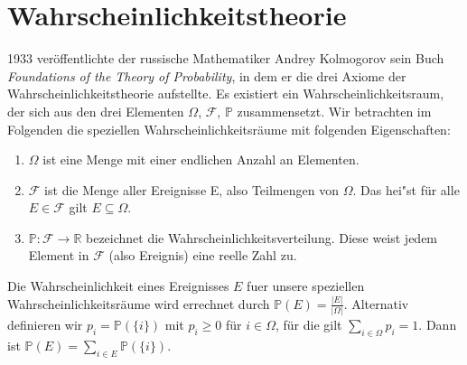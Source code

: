 \section{Wahrscheinlichkeitstheorie}
1933 ver\"offentlichte der russische Mathematiker Andrey Kolmogorov sein Buch \textit{Foundations of the Theory of Probability}, in dem er die drei Axiome der Wahrscheinlichkeitstheorie aufstellte. Es existiert ein Wahrscheinlichkeitsraum, der sich aus den drei Elementen $\Omega$, $\mathcal{F}$, $\mathbb{P}$ zusammensetzt. Wir betrachten im Folgenden die speziellen Wahrscheinlichkeitsr\"aume mit folgenden Eigenschaften:

\begin{enumerate}
	\item $\Omega$ ist eine Menge mit einer endlichen Anzahl an Elementen.
	\item $\mathcal{F}$ ist die Menge aller Ereignisse E, also Teilmengen von $\Omega$. Das hei"st f\"ur alle $E \in \mathcal{F}$ gilt $E \subseteq \Omega$.
	\item $\mathbb{P}: \mathcal{F} \rightarrow \mathbb{R}$ bezeichnet die Wahrscheinlichkeitsverteilung. Diese weist jedem Element in $\mathcal{F}$ (also Ereignis) eine reelle Zahl zu.  
	
	
\end{enumerate}

\vspace{10pt}


Die Wahrscheinlichkeit eines Ereignisses $E$ fuer unsere speziellen Wahrscheinlichkeitsr\"aume wird errechnet durch $ \mathbb{P}(E) = \frac{|E|}{|\Omega|}$.
Alternativ definieren wir $p_{i} = \mathbb{P} (\{i\})$ mit $p_{i} \geq 0$  
f\"ur $i \in \Omega$, f\"ur die gilt $\sum_{i\in \Omega} p_{i} =1$. Dann ist $\mathbb{P}(E) = \sum_{i\in E} \mathbb{P}(\{i\})$. 


